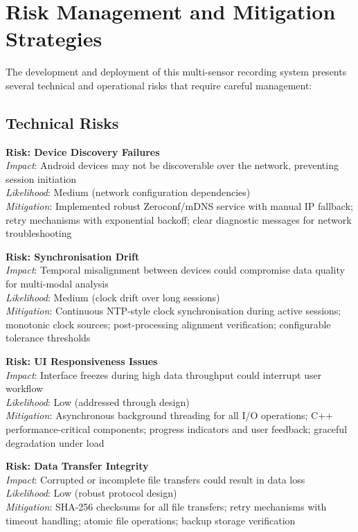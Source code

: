 \section{Risk Management and Mitigation Strategies}
The development and deployment of this multi-sensor recording system presents several technical and operational risks that require careful management:

\subsection{Technical Risks}
\textbf{Risk: Device Discovery Failures}\\
\emph{Impact}: Android devices may not be discoverable over the network, preventing session initiation\\
\emph{Likelihood}: Medium (network configuration dependencies)\\
\emph{Mitigation}: Implemented robust Zeroconf/mDNS service with manual IP fallback; retry mechanisms with exponential backoff; clear diagnostic messages for network troubleshooting

\textbf{Risk: Synchronisation Drift}\\
\emph{Impact}: Temporal misalignment between devices could compromise data quality for multi-modal analysis\\
\emph{Likelihood}: Medium (clock drift over long sessions)\\
\emph{Mitigation}: Continuous NTP-style clock synchronisation during active sessions; monotonic clock sources; post-processing alignment verification; configurable tolerance thresholds

\textbf{Risk: UI Responsiveness Issues}\\
\emph{Impact}: Interface freezes during high data throughput could interrupt user workflow\\
\emph{Likelihood}: Low (addressed through design)\\
\emph{Mitigation}: Asynchronous background threading for all I/O operations; C++ performance-critical components; progress indicators and user feedback; graceful degradation under load

\textbf{Risk: Data Transfer Integrity}\\
\emph{Impact}: Corrupted or incomplete file transfers could result in data loss\\
\emph{Likelihood}: Low (robust protocol design)\\
\emph{Mitigation}: SHA-256 checksums for all file transfers; retry mechanisms with timeout handling; atomic file operations; backup storage verification


